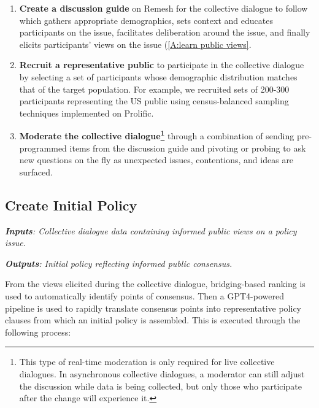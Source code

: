 \documentclass{article}
\begin{document}
\begin{enumerate}
    \item \textbf{Create a discussion guide} on Remesh for the collective dialogue to follow which gathers appropriate demographics, sets context and educates participants on the issue, facilitates deliberation around the issue, and finally elicits participants' views on the issue (\ref{A:learn public views}.
    \item \textbf{Recruit a representative public} to participate in the collective dialogue by selecting a set of participants whose demographic distribution matches that of the target population. For example, we recruited sets of 200-300 participants representing the US public using census-balanced sampling techniques implemented on Prolific.
    \item \textbf{Moderate the collective dialogue\footnote{This type of real-time moderation is only required for live collective dialogues. In asynchronous collective dialogues, a moderator can still adjust the discussion while data is being collected, but only those who participate after the change will experience it.}} through a combination of sending pre-programmed items from the discussion guide and pivoting or probing to ask new questions on the fly as unexpected issues, contentions, and ideas are surfaced. 
\end{enumerate}


\subsection{Create Initial Policy}

\begin{tcolorbox}[colback=blue!5!white,colframe=blue!30!white]
\emph{\textbf{Inputs}: Collective dialogue data containing informed public views on a policy issue.}

\emph{\textbf{Outputs}: Initial policy reflecting informed public consensus.}
\end{tcolorbox}


From the views elicited during the collective dialogue, bridging-based ranking \cite{ovadya2022bridging,recommendation2022bridging} is used to automatically identify points of consensus. Then a GPT4-powered pipeline is used to rapidly translate consensus points into representative policy clauses from which an initial policy is assembled. This is executed through the following process:
\end{document}
